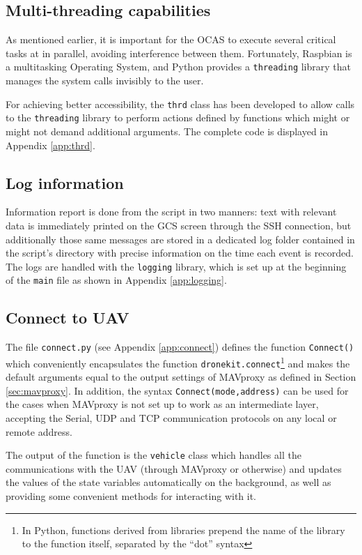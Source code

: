 \subsection{Multi-threading capabilities}

As mentioned earlier, it is important for the OCAS to execute several critical tasks at in parallel, avoiding interference between them.
Fortunately, Raspbian is a multitasking Operating System, and Python provides a \texttt{threading} library that manages the system calls invisibly to the user.

For achieving better accessibility, the \texttt{thrd} class has been developed to allow calls to the \texttt{threading} library to perform actions defined by functions which might or might not demand additional arguments.
The complete code is displayed in Appendix \ref{app:thrd}.

\subsection{Log information}

Information report is done from the script in two manners:
text with relevant data is immediately printed on the GCS screen through the SSH connection, but additionally those same messages are stored in a dedicated log folder contained in the script's directory with precise information on the time each event is recorded.
The logs are handled with the \texttt{logging} library, which is set up at the beginning of the \texttt{main} file as shown in Appendix \ref{app:logging}.

\subsection{Connect to UAV}

The file \texttt{connect.py} (see Appendix \ref{app:connect}) defines the function \texttt{Connect()} which conveniently encapsulates the function \texttt{dronekit.connect}\footnote{In Python, functions derived from libraries prepend the name of the library to the function itself, separated by the ``dot'' syntax} and makes the default arguments equal to the output settings of MAVproxy as defined in Section \ref{sec:mavproxy}.
In addition, the syntax \texttt{Connect(mode,address)} can be used for the cases when MAVproxy is not set up to work as an intermediate layer, accepting the Serial, UDP and TCP communication protocols on any local or remote address.

The output of the function is the \texttt{vehicle} class which handles all the communications with the UAV (through MAVproxy or otherwise) and updates the values of the state variables automatically on the background, as well as providing some convenient methods for interacting with it.

